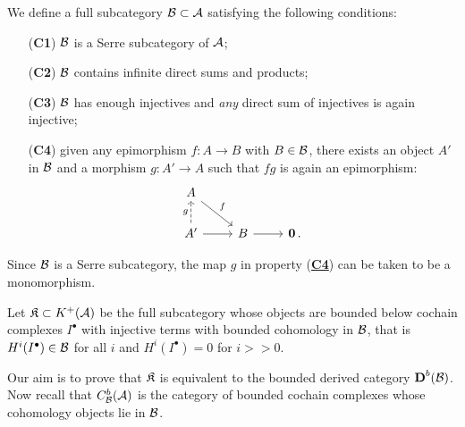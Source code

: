 \begin{df}
	We define a full subcategory $\mathcal{B} \subset \mathcal{A}$ satisfying the following conditions:
	\begin{itemize}
		\item[(\textbf{C1})]\label{C1} $\mathcal{B}$ is a Serre subcategory of $\mathcal{A}$;
		
		\item[(\textbf{C2})]\label{C2} $\mathcal{B}$ contains infinite direct sums and products;
		
		\item[(\textbf{C3})]\label{C3} $\mathcal{B}$ has enough injectives 
		and \emph{any} direct sum of injectives is again injective;
		
		\item[(\textbf{C4})]\label{C4} given any epimorphism $f:A \to B$ with $B \in \mathcal{B}$,
		there exists an object $A'$ in $\mathcal{B}$ and a morphism $g:A' \to A$ 
		such that $fg$ is again an epimorphism:
		\begin{equation*}
			\begin{tikzcd}
				A \ar[dr, "f"] & & \\
				A' \ar[r] \ar[u, "g", dashed] & B \ar[r] & \cat{0}\,.
			\end{tikzcd}
		\end{equation*}
	\end{itemize}
\end{df}

\begin{rmk}
	Since $\mathcal{B}$ is a Serre subcategory, 
	the map $g$ in property (\hyperref[C4]{\textbf{C4}}) can be taken to be a monomorphism.
\end{rmk}

\begin{df!}\label{cat-K}
	Let $\mathfrak{K} \subset K^{+}(\mathcal{A})$ be the full subcategory whose objects are
	bounded below cochain complexes $I^{\bullet}$ with injective terms
	with bounded cohomology in $\mathcal{B}$, that is $H^{i}(I^{\bullet}) \in \mathcal{B}$ for all $i$
	and $H^{i}(I^{\bullet}) = 0$ for $i >> 0$.
\end{df!}

Our aim is to prove that $\mathfrak{K}$ is equivalent to the bounded derived category ${\normalfont\textbf{D}}^{b}(\mathcal{B})$.
Now recall that $C^{b}_{\mathcal{B}}(\mathcal{A})$ is the category of bounded cochain complexes
whose cohomology objects lie in $\mathcal{B}$.

